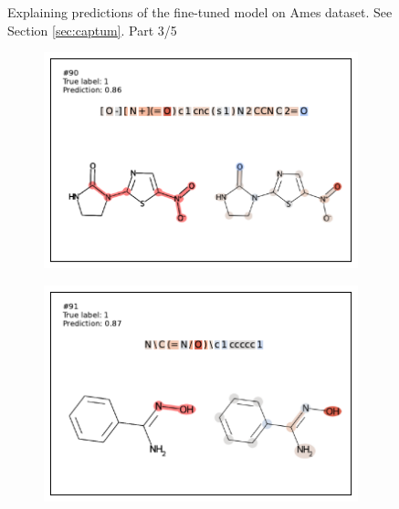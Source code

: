 \begin{figure}
\begin{subfigure}[b]{0.33\textwidth}
\end{subfigure} 
\caption{Explaining predictions of the fine-tuned model on Ames dataset. See Section \ref{sec:captum}. Part 3/5}
\label{fig:captum-ames-3}
\end{figure}

\begin{figure}
\centering
\begin{subfigure}[b]{0.33\textwidth} 
  \centering 
  \includegraphics[width=\textwidth]{figures/ames/ames90.pdf} 
\end{subfigure}\begin{subfigure}[b]{0.33\textwidth} 
  \centering 
  \includegraphics[width=\textwidth]{figures/ames/ames91.pdf} 
\end{subfigure}\begin{subfigure}[b]{0.33\textwidth} 
  \centering 

\end{subfigure}
\end{figure}
